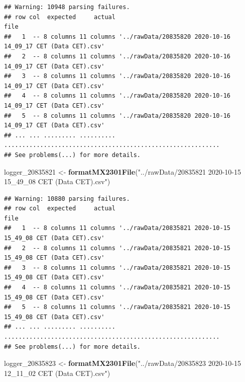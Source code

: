 \documentclass[]{article}
\newenvironment{Shaded}{\begin{snugshade}}{\end{snugshade}}
\newcommand{\DecValTok}[1]{\textcolor[rgb]{0.00,0.00,0.81}{#1}}
\newcommand{\KeywordTok}[1]{\textcolor[rgb]{0.13,0.29,0.53}{\textbf{#1}}}
\newcommand{\NormalTok}[1]{#1}
\newcommand{\StringTok}[1]{\textcolor[rgb]{0.31,0.60,0.02}{#1}}
\begin{document}
\begin{verbatim}
## Warning: 10948 parsing failures.
## row col  expected     actual                                                         file
##   1  -- 8 columns 11 columns '../rawData/20835820 2020-10-16 14_09_17 CET (Data CET).csv'
##   2  -- 8 columns 11 columns '../rawData/20835820 2020-10-16 14_09_17 CET (Data CET).csv'
##   3  -- 8 columns 11 columns '../rawData/20835820 2020-10-16 14_09_17 CET (Data CET).csv'
##   4  -- 8 columns 11 columns '../rawData/20835820 2020-10-16 14_09_17 CET (Data CET).csv'
##   5  -- 8 columns 11 columns '../rawData/20835820 2020-10-16 14_09_17 CET (Data CET).csv'
## ... ... ......... .......... ............................................................
## See problems(...) for more details.
\end{verbatim}

\begin{Shaded}
\begin{Highlighting}[]
\NormalTok{logger_}\DecValTok{20835821}\NormalTok{ <-}\StringTok{ }\KeywordTok{formatMX2301File}\NormalTok{(}\StringTok{"../rawData/20835821 2020-10-15 15_49_08 CET (Data CET).csv"}\NormalTok{)}
\end{Highlighting}
\end{Shaded}

\begin{verbatim}
## Warning: 10880 parsing failures.
## row col  expected     actual                                                         file
##   1  -- 8 columns 11 columns '../rawData/20835821 2020-10-15 15_49_08 CET (Data CET).csv'
##   2  -- 8 columns 11 columns '../rawData/20835821 2020-10-15 15_49_08 CET (Data CET).csv'
##   3  -- 8 columns 11 columns '../rawData/20835821 2020-10-15 15_49_08 CET (Data CET).csv'
##   4  -- 8 columns 11 columns '../rawData/20835821 2020-10-15 15_49_08 CET (Data CET).csv'
##   5  -- 8 columns 11 columns '../rawData/20835821 2020-10-15 15_49_08 CET (Data CET).csv'
## ... ... ......... .......... ............................................................
## See problems(...) for more details.
\end{verbatim}

\begin{Shaded}
\begin{Highlighting}[]
\NormalTok{logger_}\DecValTok{20835823}\NormalTok{ <-}\StringTok{ }\KeywordTok{formatMX2301File}\NormalTok{(}\StringTok{"../rawData/20835823 2020-10-15 12_11_02 CET (Data CET).csv"}\NormalTok{)}
\end{Highlighting}
\end{Shaded}
\end{document}
